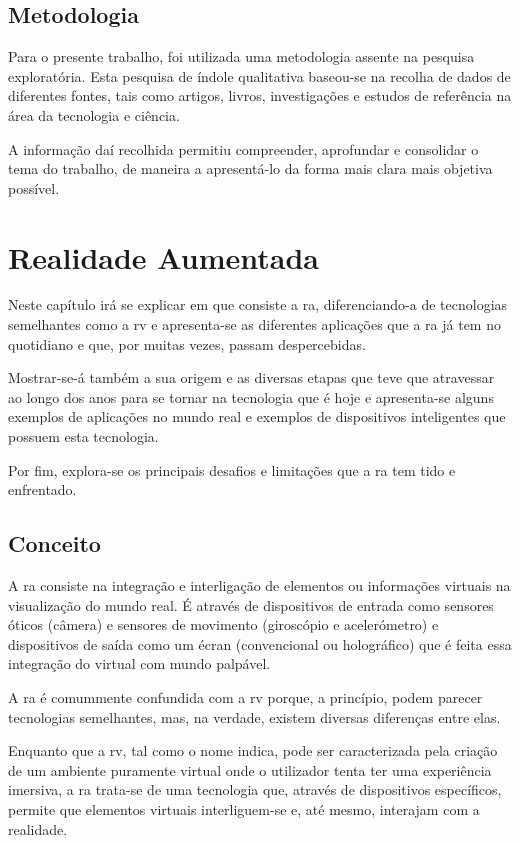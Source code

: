 \documentclass{report}
\begin{document}
\section{Metodologia}
Para o presente trabalho, foi utilizada uma metodologia assente na pesquisa exploratória. Esta pesquisa de índole qualitativa baseou-se na recolha de dados de diferentes fontes, tais como artigos, livros, investigações e estudos de referência na área da tecnologia e ciência.

A informação daí recolhida permitiu compreender, aprofundar e consolidar o tema do trabalho, de maneira a apresentá-lo da forma mais clara mais objetiva possível.

\chapter{Realidade Aumentada}
\label{chap.realidade-aumentada}
Neste capítulo irá se explicar em que consiste a \ac{ra}, diferenciando-a de tecnologias semelhantes como a \ac{rv} e apresenta-se as diferentes aplicações que a \ac{ra} já tem no quotidiano e que, por muitas vezes, passam despercebidas.

Mostrar-se-á também a sua origem e as diversas etapas que teve que atravessar ao longo dos anos para se tornar na tecnologia que é hoje e apresenta-se alguns exemplos de aplicações no mundo real e exemplos de dispositivos inteligentes que possuem esta tecnologia.

Por fim, explora-se os principais desafios e limitações que a \ac{ra} tem tido e enfrentado.

\section{Conceito}
A \ac{ra} consiste na integração e interligação de elementos ou informações virtuais na visualização do mundo real. É através de dispositivos de entrada como sensores óticos (câmera) e sensores de movimento (giroscópio e acelerómetro) e dispositivos de saída como um écran (convencional ou holográfico) que é feita essa integração do virtual com mundo palpável.

A \ac{ra} é comummente confundida com a \ac{rv} porque, a princípio, podem parecer tecnologias semelhantes, mas, na verdade, existem diversas diferenças entre elas.

Enquanto que a \ac{rv}, tal como o nome indica, pode ser caracterizada pela criação de um ambiente puramente virtual onde o utilizador tenta ter uma experiência imersiva, a \ac{ra} trata-se de uma tecnologia que, através de dispositivos específicos, permite que elementos virtuais interliguem-se e, até mesmo, interajam com a realidade.
\end{document}
